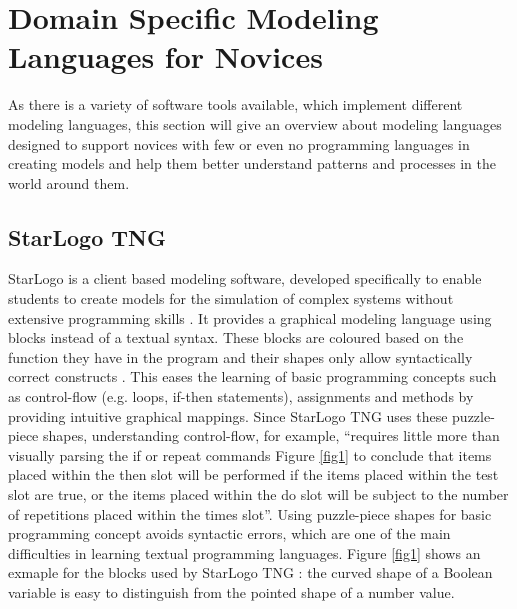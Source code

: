 \documentclass[runningheads,a4paper]{llncs}
\begin{document}
%  
 
 \section{Domain Specific Modeling Languages for Novices}
 As there is a variety of software tools available, which implement different modeling languages, this section will give an overview 
 about modeling languages designed to support novices with few or even no programming languages in creating models and help them better 
 understand patterns and processes in the world around them.
 
 \subsection{StarLogo TNG}
  StarLogo is a client based modeling software, developed specifically to enable students to 
  create models for the simulation of complex systems without extensive programming skills \cite{klopfer2009starlogo}.
  It provides a graphical modeling language using blocks instead of a textual syntax. 
  These blocks are coloured based on the function they have in the program and their shapes only allow syntactically correct constructs \cite{klopfer2009starlogo}.
  This eases the learning of basic programming concepts such as control-flow (e.g. loops, if-then statements),
  assignments and methods by providing intuitive graphical mappings. Since StarLogo TNG uses these puzzle-piece shapes, understanding 
  control-flow, for example, ``requires little more than visually parsing the if or repeat commands 
  Figure \ref{fig1} to conclude that items placed within the then slot will be performed if the items placed within the 
  test slot are true, or the items placed within the do slot will be subject to the number of repetitions placed within the times slot''\cite{smith2011biology}.
  Using puzzle-piece shapes for basic programming concept avoids syntactic errors, 
  which are one of the main difficulties in learning textual programming languages.
  Figure \ref{fig1} shows an exmaple for the blocks used by StarLogo TNG : 
  the curved shape of a Boolean variable is easy to distinguish from the pointed shape of a number value.
  
\end{document}
